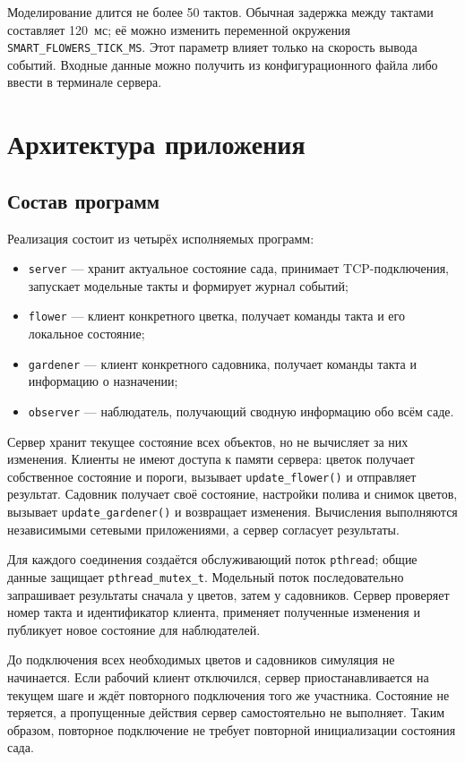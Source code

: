 \documentclass[12pt,a4paper]{article}
\begin{document}
Моделирование длится не более 50 тактов. Обычная задержка между тактами составляет 120~мс; её можно изменить переменной окружения \texttt{SMART\_FLOWERS\_TICK\_MS}. Этот параметр влияет только на скорость вывода событий. Входные данные можно получить из конфигурационного файла либо ввести в терминале сервера.

\section{Архитектура приложения}
\subsection{Состав программ}
Реализация состоит из четырёх исполняемых программ:
\begin{itemize}[nosep]
\item \texttt{server} --- хранит актуальное состояние сада, принимает TCP-подключения, запускает модельные такты и формирует журнал событий;
\item \texttt{flower} --- клиент конкретного цветка, получает команды такта и его локальное состояние;
\item \texttt{gardener} --- клиент конкретного садовника, получает команды такта и информацию о назначении;
\item \texttt{observer} --- наблюдатель, получающий сводную информацию обо всём саде.
\end{itemize}

Сервер хранит текущее состояние всех объектов, но не вычисляет за них изменения. Клиенты не имеют доступа к памяти сервера: цветок получает собственное состояние и пороги, вызывает \texttt{update\_flower()} и отправляет результат. Садовник получает своё состояние, настройки полива и снимок цветов, вызывает \texttt{update\_gardener()} и возвращает изменения. Вычисления выполняются независимыми сетевыми приложениями, а сервер согласует результаты.

Для каждого соединения создаётся обслуживающий поток \texttt{pthread}; общие данные защищает \texttt{pthread\_mutex\_t}. Модельный поток последовательно запрашивает результаты сначала у цветов, затем у садовников. Сервер проверяет номер такта и идентификатор клиента, применяет полученные изменения и публикует новое состояние для наблюдателей.

До подключения всех необходимых цветов и садовников симуляция не начинается. Если рабочий клиент отключился, сервер приостанавливается на текущем шаге и ждёт повторного подключения того же участника. Состояние не теряется, а пропущенные действия сервер самостоятельно не выполняет. Таким образом, повторное подключение не требует повторной инициализации состояния сада.
\end{document}

